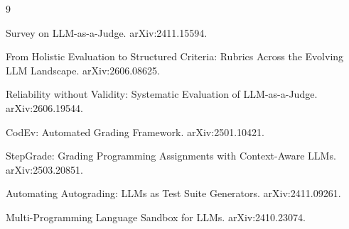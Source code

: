 \documentclass[a4paper,12pt]{report}
\begin{document}

\begin{thebibliography}{9}

Survey on LLM-as-a-Judge. arXiv:2411.15594.

From Holistic Evaluation to Structured Criteria: Rubrics Across the
Evolving LLM Landscape. arXiv:2606.08625.

Reliability without Validity: Systematic Evaluation of LLM-as-a-Judge.
arXiv:2606.19544.

CodEv: Automated Grading Framework. arXiv:2501.10421.

StepGrade: Grading Programming Assignments with Context-Aware LLMs.
arXiv:2503.20851.

Automating Autograding: LLMs as Test Suite Generators. arXiv:2411.09261.

Multi-Programming Language Sandbox for LLMs. arXiv:2410.23074.

\end{thebibliography}
\end{document}
